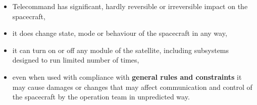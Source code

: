 \begin{itemize}
    \item Telecommand has significant, hardly reversible or irreversible impact on the spacecraft,
    \item it does change state, mode or behaviour of the spacecraft in any way,
    \item it can turn on or off any module of the satellite, including subsystems designed to run limited number of times,
    \item even when used with compliance with \textbf{general rules and constraints} it may cause damages or changes that may affect communication and control of the spacecraft by the operation team in unpredicted way.
\end{itemize}
